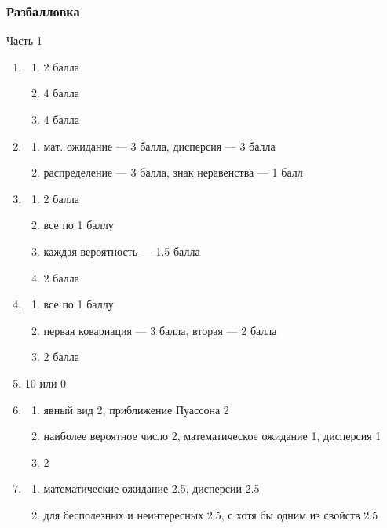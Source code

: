 \documentclass[12pt, a4paper]{article}\usepackage[]{graphicx}\usepackage[]{color}
\begin{document}
\subsubsection*{Разбалловка}
Часть 1

\begin{enumerate}
\item
\begin{enumerate}
\item 2 балла
\item 4 балла
\item 4 балла
\end{enumerate}

\item
\begin{enumerate}
\item мат. ожидание — 3 балла, дисперсия — 3 балла
\item распределение — 3 балла, знак неравенства — 1 балл

\end{enumerate}

\item
\begin{enumerate}
\item 2 балла
\item все по 1 баллу
\item каждая вероятность — 1.5 балла
\item 2 балла

\end{enumerate}

\item
\begin{enumerate}
\item все по 1 баллу
\item первая ковариация — 3 балла, вторая — 2 балла
\item 2 балла
\end{enumerate}



\item 10 или 0

\item
\begin{enumerate}
\item явный вид 2, приближение Пуассона 2
\item наиболее вероятное число 2, математическое ожидание 1, дисперсия 1
\item 2
\end{enumerate}

\item
\begin{enumerate}
\item математические ожидание 2.5, дисперсии 2.5
\item для бесполезных и неинтересных 2.5, с хотя бы одним из свойств 2.5


\end{enumerate}
\end{enumerate}
\end{document}
